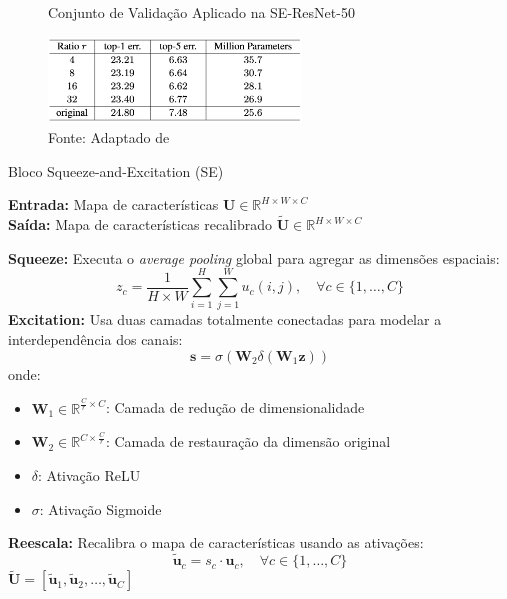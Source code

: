\begin{figure}[h!]
    \centering
    \caption{Conjunto de Validação Aplicado na SE-ResNet-50}
    \includegraphics[width=0.6\textwidth]{figures/fig027.png}
    \caption*{Fonte: Adaptado de \cite{huSqueezeandExcitationNetworks2018}}
    \label{fig:fig027}
\end{figure}

\begin{algorithm}
\caption{Bloco Squeeze-and-Excitation (SE)}
\label{alg:se_block}
\textbf{Entrada:} Mapa de características $\mathbf{U} \in \mathbb{R}^{H \times W \times C}$\\
\textbf{Saída:} Mapa de características recalibrado $\tilde{\mathbf{U}} \in \mathbb{R}^{H \times W \times C}$
\begin{algorithmic}[1]
\STATE \textbf{Squeeze:} Executa o \textit{average pooling} global para agregar as dimensões espaciais:
\[
z_c = \frac{1}{H \times W} \sum_{i=1}^H \sum_{j=1}^W u_c(i, j), \quad \forall c \in \{1, \dots, C\}
\]
\STATE \textbf{Excitation:} Usa duas camadas totalmente conectadas para modelar a interdependência dos canais:
\[
\mathbf{s} = \sigma(\mathbf{W}_2 \delta(\mathbf{W}_1 \mathbf{z}))
\]
onde:
\begin{itemize}
    \item $\mathbf{W}_1 \in \mathbb{R}^{\frac{C}{r} \times C}$: Camada de redução de dimensionalidade
    \item $\mathbf{W}_2 \in \mathbb{R}^{C \times \frac{C}{r}}$: Camada de restauração da dimensão original
    \item $\delta$: Ativação ReLU
    \item $\sigma$: Ativação Sigmoide
\end{itemize}
\STATE \textbf{Reescala:} Recalibra o mapa de características usando as ativações:
\[
\tilde{\mathbf{u}}_c = s_c \cdot \mathbf{u}_c, \quad \forall c \in \{1, \dots, C\}
\]
\RETURN $\tilde{\mathbf{U}} = [\tilde{\mathbf{u}}_1, \tilde{\mathbf{u}}_2, \dots, \tilde{\mathbf{u}}_C]$
\end{algorithmic}
\end{algorithm}


